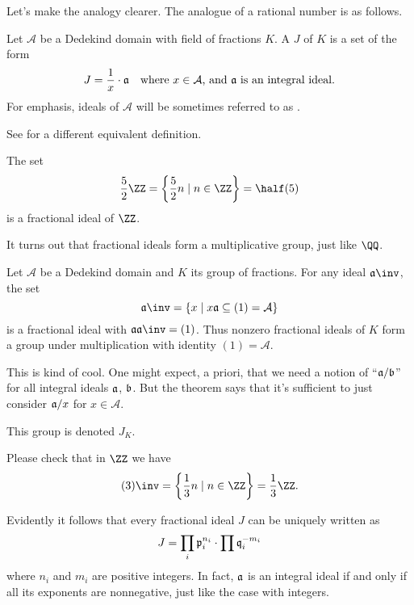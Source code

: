 Let's make the analogy clearer.
The analogue of a rational number is as follows.

\begin{definition}
	Let $\mathcal A$ be a Dedekind domain with field of fractions $K$.
	A  $J$ of $K$ is a set of the form 
	\[ J = \frac{1}{x} \cdot \aa \quad \text{where $x \in \mathcal A$, and $\aa$ is an integral ideal.} \]
	For emphasis, ideals of $\mathcal A$ will be sometimes referred to as .
\end{definition}
See  for a different equivalent definition.

\begin{example}
	The set \[ \frac52 \ZZ = \left\{ \frac52n \mid n \in \ZZ \right\} = \half (5) \]
	is a fractional ideal of $\ZZ$.
\end{example}

It turns out that fractional ideals form a multiplicative group,
just like $\QQ$.
\begin{theorem}
	Let $\mathcal A$ be a Dedekind domain and $K$ its group of fractions.
	For any ideal $\aa\inv$, the set
	\[ \aa\inv = \left\{ x \mid x\aa \subseteq (1) = \mathcal A  \right\} \]
	is a fractional ideal with $\aa \aa\inv = (1)$.
	Thus nonzero fractional ideals of $K$ form a group under multiplication
	with identity $(1) = \mathcal A$.
\end{theorem}
This is kind of cool.
One might expect, a priori, that we need a notion of ``$\aa / \bb$'' for all integral ideals $\aa$, $\bb$.
But the theorem says that it's sufficient to just consider  $\aa / x$ for $x \in \mathcal A$.
\begin{definition}
	This group is denoted $J_K$.
\end{definition}

\begin{example}
	Please check that in $\ZZ$ we have
	\[ (3)\inv = \left\{ \frac 13 n \mid n \in \ZZ \right\} = \frac 13 \ZZ. \]
\end{example}

Evidently it follows that every fractional ideal $J$ can be uniquely written as
\[ J = \prod_i \pp_i^{n_i} \cdot \prod \qq_i^{-m_i} \]
where $n_i$ and $m_i$ are positive integers.
In fact, $\aa$ is an integral ideal if and only if all its exponents are nonnegative,
just like the case with integers.

